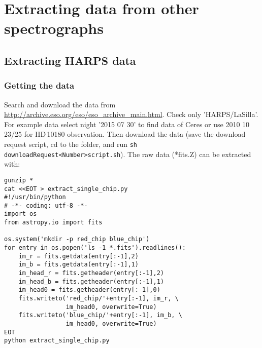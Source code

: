 \documentclass[10pt,a4paper]{article}
\begin{document}



\newpage

\section{Extracting data from other spectrographs}

\subsection{Extracting HARPS data}

\subsubsection{Getting the data}
Search and download the data from \url{http://archive.eso.org/eso/eso_archive_main.html}. Check only 'HARPS/LaSilla'. For example data select night '2015 07 30' to find data of Ceres or use 2010 10 23/25 for HD\,10180 observation. Then download the data (save the download request script, cd to the folder, and run \verb|sh  downloadRequest<Number>script.sh|). The raw data (*fits.Z) can be extracted with:
\begin{lstlisting}[style=base]
gunzip *
cat <<EOT > extract_single_chip.py
#!/usr/bin/python
# -*- coding: utf-8 -*-
import os
from astropy.io import fits

os.system('mkdir -p red_chip blue_chip')
for entry in os.popen('ls -1 *.fits').readlines():
    im_r = fits.getdata(entry[:-1],2)
    im_b = fits.getdata(entry[:-1],1)
    im_head_r = fits.getheader(entry[:-1],2)
    im_head_b = fits.getheader(entry[:-1],1)
    im_head0 = fits.getheader(entry[:-1],0)
    fits.writeto('red_chip/'+entry[:-1], im_r, \
                 im_head0, overwrite=True)
    fits.writeto('blue_chip/'+entry[:-1], im_b, \
                 im_head0, overwrite=True)
EOT
python extract_single_chip.py
\end{lstlisting}
\end{document}

